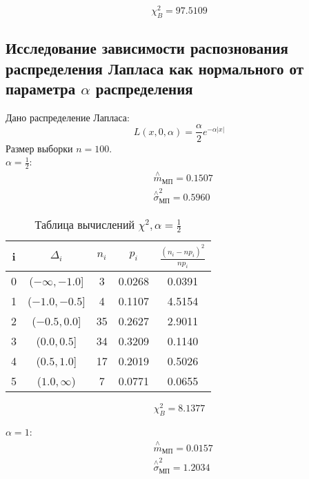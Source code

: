\documentclass[a4]{article}
\begin{document}
$$\chi_B^2 = 97.5109$$ 
\subsection{Исследование зависимости распознования распределения Лапласа как нормального от параметра $\alpha$ распределения}
Дано распределение Лапласа:
\begin{equation}\label{eqn:laplace}
L\left( x,0,\alpha\right) = \frac{\alpha}{2}e^{-\alpha\vert x\vert}
\end{equation}
Размер выборки $n = 100$. \\
$\alpha= \frac{1}{2}$:
  \begin{equation}
  \begin{split}
  &\overset{\wedge}{m}_{\text{МП}} =0.1507\\
  &  \overset{\wedge}{\sigma}^2_{\text{МП}} = 0.5960
  \end{split}
  \end{equation}

\begin{table}[H]
	\caption{Таблица вычислений $\chi^2, \alpha= \frac{1}{2}$}
	\label{tab:my_label1}
	\begin{center}
		\vspace{5mm}
		\begin{tabular}{|c|c|c|c|c|}
			\hline
			i & $\Delta_i$ & $n_i$ & $p_i$ & $\frac{(n_i-np_i)^2}{np_i}$\\ \hline
0&  ($-\infty ,-1.0$]&  3&  0.0268&  0.0391\\ \hline
1&  ($-1.0,-0.5$]&  4&  0.1107&  4.5154\\ \hline
2&  ($-0.5,0.0$]&  35&  0.2627&  2.9011\\ \hline
3&  ($0.0,0.5$]&  34&  0.3209&  0.1140\\ \hline
4&  ($0.5,1.0$]&  17&  0.2019&  0.5026\\ \hline
5&  ($ 1.0,\infty$)&  7&  0.0771&  0.0655\\ \hline
		\end{tabular}
	\end{center}
\end{table}

$$\chi_B^2 = 8.1377$$ 

$\alpha= 1$:
  \begin{equation}
  \begin{split}
  &\overset{\wedge}{m}_{\text{МП}} =0.0157\\
  &  \overset{\wedge}{\sigma}^2_{\text{МП}} = 1.2034
  \end{split}
  \end{equation}
\end{document}
